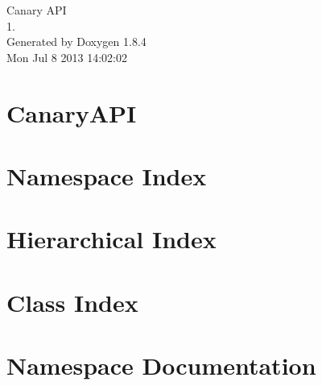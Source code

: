 \documentclass[twoside]{book}
\newcommand{\clearemptydoublepage}{%
  \newpage{\pagestyle{empty}\cleardoublepage}%
}
\begin{document}
\hypersetup{pageanchor=false}
\begin{titlepage}
\vspace*{7cm}
\begin{center}%
{\Large Canary A\-P\-I \\[1ex]\large 1. }\\
\vspace*{1cm}
{\large Generated by Doxygen 1.8.4}\\
\vspace*{0.5cm}
{\small Mon Jul 8 2013 14:02:02}\\
\end{center}
\end{titlepage}
\clearemptydoublepage
\tableofcontents
\clearemptydoublepage
{}
\hypersetup{pageanchor=true}

\chapter{Canary\-A\-P\-I}
\label{md_README}
\hypertarget{md_README}{}

\chapter{Namespace Index}

\chapter{Hierarchical Index}

\chapter{Class Index}

\chapter{Namespace Documentation}















\end{document}
